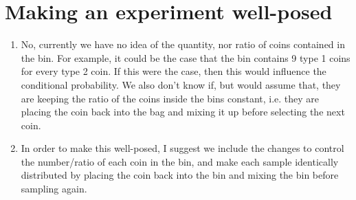 \documentclass{article}
\begin{document}
\section{Making an experiment well-posed}
    \begin{enumerate}[label=\roman*)]
        \item No, currently we have no idea of the quantity, nor ratio of coins
        contained in the bin. For example, it could be the case that the bin
        contains 9 type 1 coins for every type 2 coin. If this were the case,
        then this would influence the conditional probability. We also don't
        know if, but would assume that, they are keeping the ratio of the coins
        inside the bins constant, i.e. they are placing the coin back into the
        bag and mixing it up before selecting the next coin. 
        \item In order to make this well-posed, I suggest we include the changes
        to control the number/ratio of each coin in the bin, and make each
        sample identically distributed by placing the coin back into the bin and
        mixing the bin before sampling again. 
    \end{enumerate}
\end{document}

